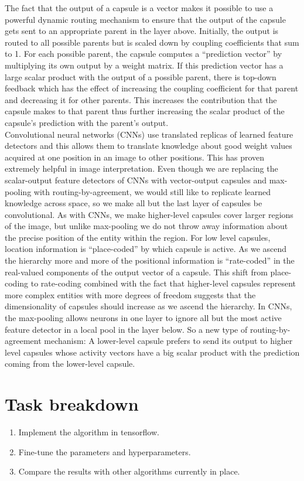 \documentclass[10pt,twocolumn,letterpaper]{article}
\begin{document}
The fact that the output of a capsule is a vector makes it possible to use a powerful dynamic routing mechanism to ensure that the output of the capsule gets sent to an appropriate parent in the layer above. Initially, the output is routed to all possible parents but is scaled down by coupling coefficients that sum to 1. For each possible parent, the capsule computes a “prediction vector” by multiplying its own output by a weight matrix. If this prediction vector has a large scalar product with the output of a possible parent, there is top-down feedback which has the effect of increasing the coupling coefficient for that parent and decreasing it for other parents. This increases the contribution that the capsule makes to that parent thus further increasing the scalar product of the capsule’s prediction with the parent’s output.
\\
Convolutional neural networks (CNNs) use translated replicas of learned feature detectors and this allows them to translate knowledge about good weight values acquired at one position in an image to other positions. This has proven extremely helpful in image interpretation. Even though we are replacing the scalar-output feature detectors of CNNs with vector-output capsules and max-pooling with routing-by-agreement, we would still like to replicate learned knowledge across space, so we make all but the last layer of capsules be convolutional. As with CNNs, we make higher-level capsules cover larger regions of the image, but unlike max-pooling we do not throw away information about the precise position of the entity within the region. For low level capsules, location information is “place-coded” by which capsule is active. As we ascend the hierarchy more and more of the positional information is “rate-coded” in the real-valued components of the output vector of a capsule. This shift from place-coding to rate-coding combined with the fact that higher-level capsules represent more complex entities with more degrees of freedom suggests that the dimensionality of capsules should increase as we ascend the hierarchy.
In CNNs, the max-pooling allows neurons in one layer to ignore all but the most active feature detector in a local pool in the layer below. So a new type of routing-by-agreement mechanism: A lower-level capsule prefers to send its output to higher level capsules whose activity vectors have a big scalar product with the prediction coming from the lower-level capsule. 
\\

\section{Task breakdown}
\begin{enumerate}
	\item Implement the algorithm in tensorflow.
	\item Fine-tune the parameters and hyperparameters.
	\item Compare the results with other algorithms currently in place.
\end{enumerate}
\end{document}
